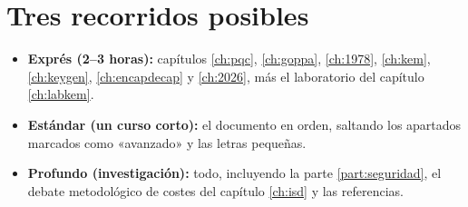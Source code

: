 \documentclass[11pt,a4paper,oneside]{report}
\begin{document}
\section*{Tres recorridos posibles}
\begin{itemize}[leftmargin=1.4em,itemsep=2pt]
  \item \textbf{Exprés (2--3 horas):} capítulos \ref{ch:pqc}, \ref{ch:goppa},
        \ref{ch:1978}, \ref{ch:kem}, \ref{ch:keygen}, \ref{ch:encapdecap} y \ref{ch:2026},
        más el laboratorio del capítulo \ref{ch:labkem}.
  \item \textbf{Estándar (un curso corto):} el documento en orden, saltando los
        apartados marcados como «avanzado» y las letras pequeñas.
  \item \textbf{Profundo (investigación):} todo, incluyendo la parte \ref{part:seguridad},
        el debate metodológico de costes del capítulo \ref{ch:isd} y las referencias.
\end{itemize}
\end{document}
